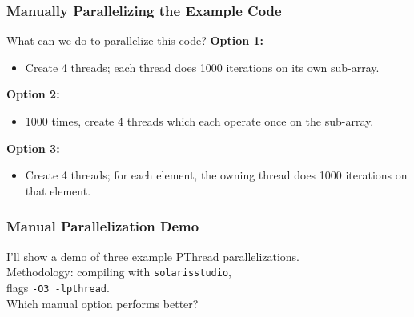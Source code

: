 \documentclass[aspectratio=43]{beamer}
\newenvironment{changemargin}[1]{%
  \begin{list}{}{%
    \setlength{\topsep}{0pt}%
    \setlength{\leftmargin}{#1}%
    \setlength{\rightmargin}{1em}
    \setlength{\listparindent}{\parindent}%
    \setlength{\itemindent}{\parindent}%
    \setlength{\parsep}{\parskip}%
  }%
  \item[]}{\end{list}}
\begin{document}
\begin{frame}
  \frametitle{Manually Parallelizing the Example Code}

\begin{changemargin}{1.5cm}
  What can we do to parallelize this code?
  \vfill
  {\bf Option 1:} 

  \begin{itemize}
    \item<2-> Create 4 threads; each thread does 1000 iterations on its own sub-array.
  \end{itemize}

  {\bf Option 2:} 

  \begin{itemize}
    \item<3-> 1000 times, create 4 threads which each operate once on the sub-array.
  \end{itemize}

  {\bf Option 3:} 
  \begin{itemize}
    \item<4-> Create 4 threads; for each element, the owning thread does 1000 iterations on that element.
  \end{itemize}
\end{changemargin}
\end{frame}

\begin{frame}
  \frametitle{Manual Parallelization Demo}

\begin{changemargin}{1.5cm}
  I'll show a demo of three example PThread parallelizations.\\[1em]

  Methodology: compiling with {\tt solarisstudio}, \\ flags {\tt -O3 -lpthread}.\\[1em]

  Which manual option performs better?
\end{changemargin}

\end{frame}
\end{document}
